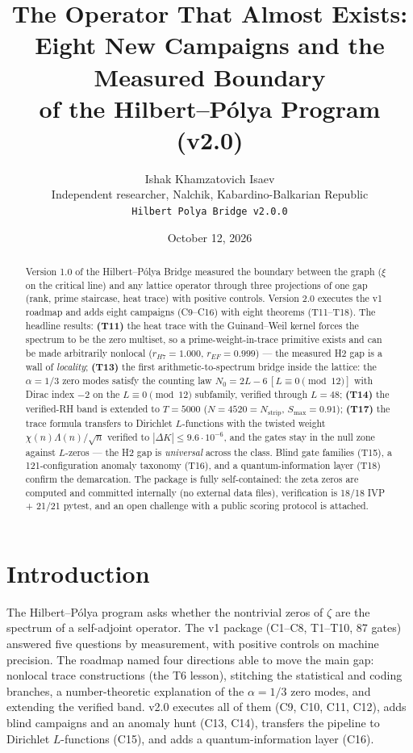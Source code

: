 \documentclass[11pt]{article}
\title{\bf The Operator That Almost Exists:\\ Eight New Campaigns and the Measured Boundary\\ of the Hilbert--P\'olya Program (v2.0)}
\author{Ishak Khamzatovich Isaev\\
\small Independent researcher, Nalchik, Kabardino-Balkarian Republic\\
\small \texttt{Hilbert Polya Bridge v2.0.0}}
\date{October 12, 2026}
\theoremstyle{definition}
\begin{document}
\maketitle

\begin{abstract}
Version 1.0 of the Hilbert--P\'olya Bridge measured the boundary between
the graph ($\xi$ on the critical line) and any lattice operator through
three projections of one gap (rank, prime staircase, heat trace) with
positive controls. Version 2.0 executes the v1 roadmap and adds eight
campaigns (C9--C16) with eight theorems (T11--T18). The headline results:
\textbf{(T11)} the heat trace with the Guinand--Weil kernel forces the
spectrum to be the zero multiset, so a prime-weight-in-trace primitive
exists and can be made arbitrarily nonlocal ($r_{H7}=1.000$,
$r_{EF}=0.999$) --- the measured H2 gap is a wall of \emph{locality};
\textbf{(T13)} the first arithmetic-to-spectrum bridge inside the lattice:
the $\alpha=1/3$ zero modes satisfy the counting law
$N_0 = 2L - 6\,[L \equiv 0 \pmod{12}]$ with Dirac index $-2$ on the
$L \equiv 0 \pmod{12}$ subfamily, verified through $L=48$;
\textbf{(T14)} the verified-RH band is extended to $T=5000$
($N = 4520 = N_{\mathrm{strip}}$, $S_{\max}=0.91$);
\textbf{(T17)} the trace formula transfers to Dirichlet $L$-functions with
the twisted weight $\chi(n)\Lambda(n)/\sqrt{n}$ verified to
$|\Delta K| \le 9.6\cdot 10^{-6}$, and the gates stay in the null zone
against $L$-zeros --- the H2 gap is \emph{universal} across the class.
Blind gate families (T15), a 121-configuration anomaly taxonomy (T16), and
a quantum-information layer (T18) confirm the demarcation. The package is
fully self-contained: the zeta zeros are computed and committed internally
(no external data files), verification is 18/18 IVP + 21/21 pytest, and an
open challenge with a public scoring protocol is attached.
\end{abstract}

\section{Introduction}
The Hilbert--P\'olya program asks whether the nontrivial zeros of $\zeta$
are the spectrum of a self-adjoint operator. The v1 package (C1--C8,
T1--T10, 87 gates) answered five questions by measurement, with positive
controls on machine precision. The roadmap named four directions able to
move the main gap: nonlocal trace constructions (the T6 lesson), stitching
the statistical and coding branches, a number-theoretic explanation of the
$\alpha = 1/3$ zero modes, and extending the verified band. v2.0 executes
all of them (C9, C10, C11, C12), adds blind campaigns and an anomaly hunt
(C13, C14), transfers the pipeline to Dirichlet $L$-functions (C15), and
adds a quantum-information layer (C16).
\end{document}
